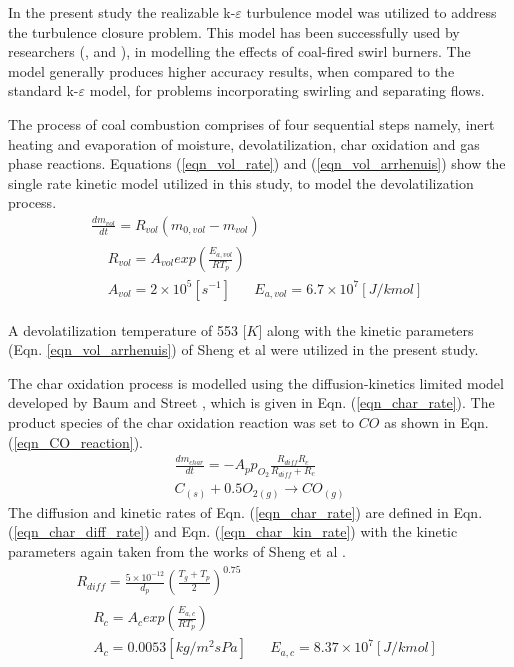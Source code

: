 \documentclass[11pt,cleanfoot]{asme2ej}
\begin{document}
In the present study the realizable k-$\varepsilon$ turbulence model was utilized to address the turbulence closure problem. This model has been successfully used by researchers (\cite{Belosevic2019a},\cite{Laubscher2019a} and \cite{Modlinski2019}), in modelling the effects of coal-fired swirl burners. The model generally produces higher accuracy results, when compared to the standard k-$\varepsilon$ model, for problems incorporating swirling and separating flows.

The process of coal combustion comprises of four sequential steps namely, inert heating and evaporation of moisture, devolatilization, char oxidation and gas phase reactions. Equations (\ref{eqn_vol_rate}) and (\ref{eqn_vol_arrhenuis}) show the single rate kinetic model utilized in this study, to model the devolatilization process.
\begin{gather}
\frac{dm_{vol}}{dt} = R_{vol}(m_{0,vol}-m_{vol}) \label{eqn_vol_rate} \\
\begin{split}
&R_{vol} = A_{vol}exp\left(\frac{E_{a,vol}}{RT_p}\right)\\
&A_{vol} = 2\times10^5 [s^{-1}]\,\,\,\,\,\,\,\,\,\,E_{a,vol} = 6.7\times10^7 [J/kmol] \label{eqn_vol_arrhenuis}
\end{split}
\end{gather}

A devolatilization temperature of 553 [$K$] \cite{Ranade2015} along with the kinetic parameters (Eqn. \ref{eqn_vol_arrhenuis}) of Sheng et al \cite{Sheng2004} were utilized in the present study.

The char oxidation process is modelled using the diffusion-kinetics limited model developed by Baum and Street \cite{Baum1971}, which is given in Eqn. (\ref{eqn_char_rate}). The product species of the char oxidation reaction was set to $CO$ as shown in Eqn. (\ref{eqn_CO_reaction}). 
\begin{gather}
\frac{dm_{char}}{dt} = -A_p p_{O_{2}} \frac{R_{diff}R_c}{R_{diff} + R_c}  \label{eqn_char_rate}\\
C_{(s)}+0.5O_{2(g)}\to CO_{(g)} \label{eqn_CO_reaction}
\end{gather}
The diffusion and kinetic rates of Eqn. (\ref{eqn_char_rate}) are defined in Eqn. (\ref{eqn_char_diff_rate})  and Eqn. (\ref{eqn_char_kin_rate}) with the kinetic parameters again taken from the works of Sheng et al \cite{Sheng2004}.
\begin{gather}
R_{diff} = \frac{5\times10^{-12}}{d_p} \left(\frac{T_g+T_p}{2}\right)^{0.75} \label{eqn_char_diff_rate}\\
\begin{split}
&R_{c} = A_{c}exp\left(\frac{E_{a,c}}{RT_p}\right)\\
&A_{c} = 0.0053 [kg/m^2sPa]\,\,\,\,\,\,\,\,\,\,E_{a,c} = 8.37\times10^7 [J/kmol]
\end{split}
 \label{eqn_char_kin_rate}
\end{gather}
\end{document}
